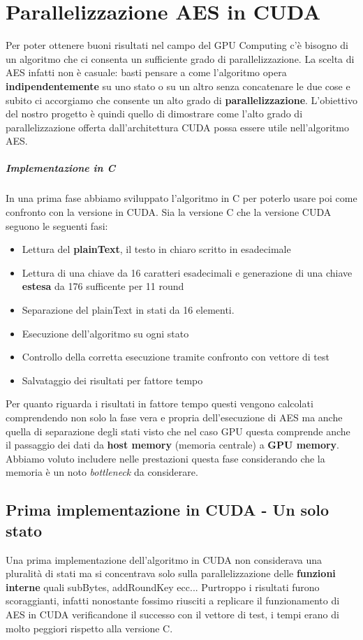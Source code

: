 \chapter{Parallelizzazione AES in CUDA}
Per poter ottenere buoni risultati nel campo del GPU Computing c'è bisogno di un algoritmo che ci consenta un sufficiente grado di parallelizzazione.
La scelta di AES infatti non è casuale: basti pensare a come l'algoritmo opera \textbf{indipendentemente} su uno stato o su un altro senza concatenare le due cose e subito ci accorgiamo che consente un alto grado di \textbf{parallelizzazione}.
L'obiettivo del nostro progetto è quindi quello di dimostrare come l'alto grado di parallelizzazione offerta dall'architettura CUDA possa essere utile nell'algoritmo AES. 

\paragraph{Implementazione in C}In una prima fase abbiamo sviluppato l'algoritmo in C per poterlo usare poi come confronto con la versione in CUDA. Sia la versione C che la versione CUDA seguono le seguenti fasi:
\begin{itemize}
\item Lettura del \textbf{plainText}, il testo in chiaro scritto in esadecimale
\item Lettura di una chiave da 16 caratteri esadecimali e generazione di una chiave \textbf{estesa} da 176 sufficente per 11 round
\item Separazione del plainText in stati da 16 elementi.
\item Esecuzione dell'algoritmo su ogni stato
\item Controllo della corretta esecuzione tramite confronto con vettore di test
\item Salvataggio dei risultati per fattore tempo
\end{itemize}

Per quanto riguarda i risultati in fattore tempo questi vengono calcolati comprendendo non solo la fase vera e propria dell'esecuzione di AES ma anche quella di separazione degli stati visto che nel caso GPU questa comprende anche il passaggio dei dati da \textbf{host memory} (memoria centrale) a \textbf{GPU memory}. Abbiamo voluto includere nelle prestazioni questa fase considerando che la memoria è un noto \textit{bottleneck} da considerare.

\section{Prima implementazione in CUDA - Un solo stato}
Una prima implementazione dell'algoritmo in CUDA non considerava una pluralità di stati ma si concentrava solo sulla parallelizzazione delle \textbf{funzioni interne} quali subBytes, addRoundKey ecc...
Purtroppo i risultati furono scoraggianti, infatti nonostante fossimo riusciti a replicare il funzionamento di AES in CUDA verificandone il successo con il vettore di test, i tempi erano di molto peggiori rispetto alla versione C.
